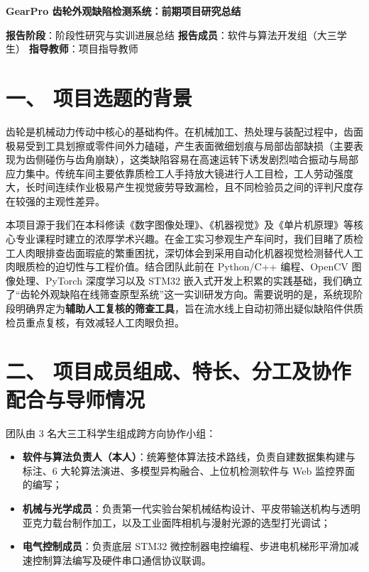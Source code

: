 
\begin{center}
{\bfseries GearPro 齿轮外观缺陷检测系统：前期项目研究总结\par}
\end{center}

\vspace{0.6em}
\noindent\textbf{报告阶段}：阶段性研究与实训进展总结 \hfill
\textbf{报告成员}：软件与算法开发组（大三学生） \hfill
\textbf{指导教师}：项目指导教师 \par
\vspace{0.8em}

\section*{一、 项目选题的背景}

齿轮是机械动力传动中核心的基础构件。在机械加工、热处理与装配过程中，齿面极易受到工具划擦或零件间外力磕碰，产生表面微细划痕与局部齿部缺损（主要表现为齿侧碰伤与齿角崩缺），这类缺陷容易在高速运转下诱发剧烈啮合振动与局部应力集中。传统车间主要依靠质检工人手持放大镜进行人工目检，工人劳动强度大，长时间连续作业极易产生视觉疲劳导致漏检，且不同检验员之间的评判尺度存在较强的主观性差异。

本项目源于我们在本科修读《数字图像处理》、《机器视觉》及《单片机原理》等核心专业课程时建立的浓厚学术兴趣。在金工实习参观生产车间时，我们目睹了质检工人肉眼排查齿面瑕疵的繁重困扰，深切体会到采用自动化机器视觉检测替代人工肉眼质检的迫切性与工程价值。结合团队此前在 Python/C++ 编程、OpenCV 图像处理、PyTorch 深度学习以及 STM32 嵌入式开发上积累的实践基础，我们确立了“齿轮外观缺陷在线筛查原型系统”这一实训研发方向。需要说明的是，系统现阶段明确界定为\textbf{辅助人工复核的筛查工具}，旨在流水线上自动初筛出疑似缺陷件供质检员重点复核，有效减轻人工肉眼负担。

\section*{二、 项目成员组成、特长、分工及协作配合与导师情况}

团队由 3 名大三工科学生组成跨方向协作小组：
\begin{itemize}
    \item \textbf{软件与算法负责人（本人）}：统筹整体算法技术路线，负责自建数据集构建与标注、6 大轮算法演进、多模型异构融合、上位机检测软件与 Web 监控界面的编写；
    \item \textbf{机械与光学成员}：负责第一代实验台架机械结构设计、平皮带输送机构与透明亚克力载台制作加工，以及工业面阵相机与漫射光源的选型打光调试；
    \item \textbf{电气控制成员}：负责底层 STM32 微控制器电控编程、步进电机梯形平滑加减速控制算法编写及硬件串口通信协议联调。
\end{itemize}

